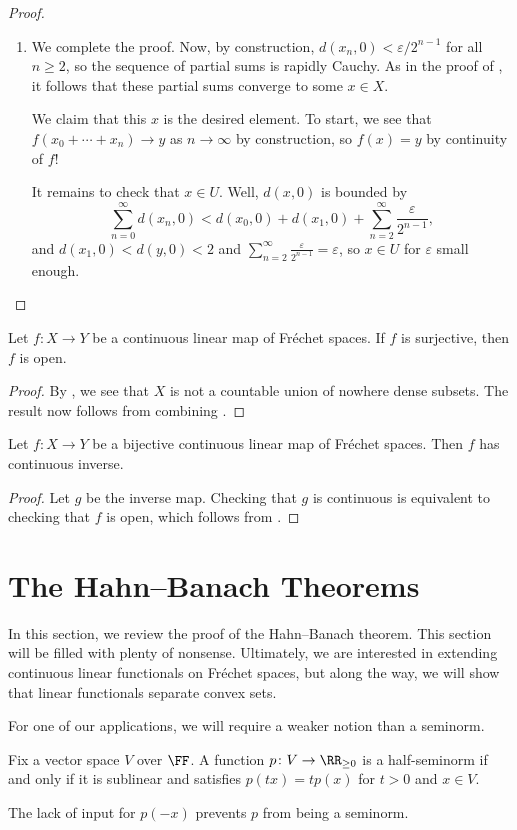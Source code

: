 \documentclass[notes.tex]{subfiles}
\begin{document}
\begin{proof}
\begin{enumerate}
		\item We complete the proof. Now, by construction, $d(x_n,0)<\varepsilon/2^{n-1}$ for all $n\ge2$, so the sequence of partial sums is rapidly Cauchy. As in the proof of , it follows that these partial sums converge to some $x\in X$.
		
		We claim that this $x$ is the desired element. To start, we see that $f(x_0+\cdots+x_n)\to y$ as $n\to\infty$ by construction, so $f(x)=y$ by continuity of $f$!

		It remains to check that $x\in U$. Well, $d(x,0)$ is bounded by
		\[\sum_{n=0}^\infty d(x_n,0)<d(x_0,0)+d(x_1,0)+\sum_{n=2}^\infty\frac\varepsilon{2^{n-1}},\]
		and $d(x_1,0)<d(y,0)<2$ and $\sum_{n=2}^\infty\frac\varepsilon{2^{n-1}}=\varepsilon$, so $x\in U$ for $\varepsilon$ small enough.
		\qedhere
	\end{enumerate}
\end{proof}
\begin{theorem} \label{thm:omt}
	Let $f\colon X\to Y$ be a continuous linear map of Fr\'echet spaces. If $f$ is surjective, then $f$ is open.
\end{theorem}
\begin{proof}
	By , we see that $X$ is not a countable union of nowhere dense subsets. The result now follows from combining .
\end{proof}
\begin{corollary}
	Let $f\colon X\to Y$ be a bijective continuous linear map of Fr\'echet spaces. Then $f$ has continuous inverse.
\end{corollary}
\begin{proof}
	Let $g$ be the inverse map. Checking that $g$ is continuous is equivalent to checking that $f$ is open, which follows from .
\end{proof}

\section{The Hahn--Banach Theorems}
In this section, we review the proof of the Hahn--Banach theorem. This section will be filled with plenty of nonsense. Ultimately, we are interested in extending continuous linear functionals on Fr\'echet spaces, but along the way, we will show that linear functionals separate convex sets.

For one of our applications, we will require a weaker notion than a seminorm.
\begin{definition}
	Fix a vector space $V$ over $\FF$. A function $p\colon V\to\RR_{\ge0}$ is a half-seminorm if and only if it is sublinear and satisfies $p(tx)=tp(x)$ for $t>0$ and $x\in V$.
\end{definition}
The lack of input for $p(-x)$ prevents $p$ from being a seminorm.
\end{document}
